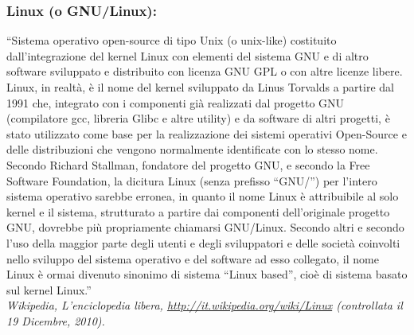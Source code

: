 \subsubsection{Linux (o GNU/Linux):} ``Sistema operativo open-source di
tipo Unix (o unix-like) costituito dall'integrazione del kernel Linux con
elementi del sistema GNU e di altro software sviluppato e distribuito con
licenza GNU GPL o con altre licenze libere. Linux, in realt\`a, \`e il nome del
kernel sviluppato da Linus Torvalds a partire dal 1991 che, integrato con i
componenti gi\`a realizzati dal progetto GNU (compilatore gcc, libreria Glibc e
altre utility) e da software di altri progetti, \`e stato utilizzato come base per
la realizzazione dei sistemi operativi Open-Source e delle distribuzioni che
vengono normalmente identificate con lo stesso nome. Secondo Richard Stallman,
fondatore del progetto GNU, e secondo la Free Software Foundation, la dicitura
Linux (senza prefisso ``GNU/'') per l'intero sistema operativo sarebbe erronea, in
quanto il nome Linux \`e attribuibile al solo kernel e il sistema, strutturato a
partire dai componenti dell'originale progetto GNU, dovrebbe pi\`u propriamente
chiamarsi GNU/Linux. Secondo altri e secondo l'uso della maggior parte degli
utenti e degli sviluppatori e delle societ\`a coinvolti nello sviluppo del sistema
operativo e del software ad esso collegato, il nome Linux \`e ormai divenuto
sinonimo di sistema ``Linux based'', cio\`e di sistema basato sul kernel
Linux.''\\ \emph{Wikipedia, L'enciclopedia libera,
\url{http://it.wikipedia.org/wiki/Linux} (controllata il 19 Dicembre, 2010).}


